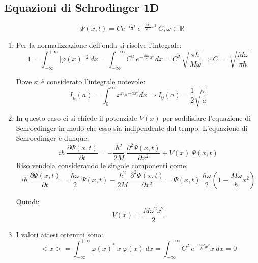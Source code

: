 \documentclass[12pt,twoside,a4]{article}
\begin{document}
\subsection{Equazioni di Schrodinger 1D}
\begin{solution}
\begin{equation*}
\Psi(x,t) = C e^{-i \frac{\omega}{2} t} \ e^{-\frac{M \omega }{2 \ \hbar} x^2}   \  C, \omega \in \mathbb{R}  
\end{equation*}

\begin{enumerate}[label=(\textit{\roman*})]
    \item Per la normalizzazione dell'onda si risolve l'integrale: 
\begin{equation*}
    1 = \int_{-\infty}^{+\infty}
    {|\varphi(x)| \ ^2 \ }dx =  \int_{-\infty}^{+\infty}
    {C^2 \ e^{-\frac{M \omega}{\hbar} x^2} }dx = C^2 \ \sqrt{\frac{\pi \hbar}{M \omega}}   \Rightarrow  C = \sqrt[4]{\frac{M \omega}{\pi \hbar}}  
\end{equation*}

Dove si è considerato l'integrale notevole: \begin{equation*}
    I_n(a) = \int_{0}^{\infty} {x^n e^{-ax^2}} dx  \Rightarrow  I_0(a) = \frac{1}{2} \sqrt{\frac{\pi}{a}} 
\end{equation*}

\item In questo caso ci si chiede il potenziale $V(x)$ per soddisfare l'equazione di Schroedinger in modo che esso sia indipendente dal tempo. L'equazione di Schroedinger è dunque: 
\begin{equation*}
    i \hbar \ \frac{\partial \Psi(x,t)}{\partial t} = -\frac{\hbar^2}{2M} \ \frac{\partial^2 \Psi(x,t)}{\partial x^2} + V(x) \ \Psi(x,t)  
\end{equation*}
Risolvendola considerando le singole componenti come: \begin{equation*}
    i \hbar \ \frac{\partial \Psi(x,t)}{\partial t} = \frac{\hbar \omega}{2} \ \Psi(x,t)  -\frac{\hbar^2}{2M} \ \frac{\partial^2 \Psi(x,t)}{\partial x^2} = \Psi(x,t) \ \frac{\hbar \omega}{2} \left(1 - \frac{M \omega}{\hbar}x^2 \right) 
\end{equation*}

Quindi: \begin{equation*}
    V(x) = \frac{M \omega^2 x^2}{2} 
\end{equation*}

\item I valori attesi ottenuti sono: 
\begin{equation*}
    < x >  = \int_{-\infty}^{+\infty} {\varphi(x)^\ast \ x \ \varphi(x)} \ dx = \int_{-\infty}^{+\infty} {C^2 \ e^{-\frac{M \omega}{\hbar}x^2} x } \ dx = 0        
\end{equation*}


\end{enumerate}
\end{solution}
\end{document}
